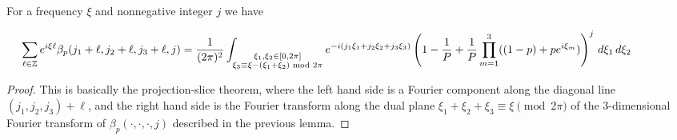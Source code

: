 \documentclass[11pt]{article}
\theoremstyle{plain}
\renewcommand{\mod}{\text{ mod }}
\begin{document}
\begin{lemma}\label{lem:beta-expression}
For a frequency $\xi$ and nonnegative integer $j$ we have

\[\hspace{-1.5cm}
\sum_{\ell \in\mathbb{Z}}e^{i\xi\ell}\beta_p(j_1+\ell,j_2+\ell,j_3+\ell,j)=\frac{1}{(2\pi)^2}\int_{\substack{\xi_1,\xi_2\in[0,2\pi]\\\xi_3\equiv \xi-(\xi_1+\xi_2) \mod 2\pi}}e^{-i(j_1 \xi_1+j_2\xi_2+j_3\xi_3)}\left(1-\frac{1}{P}+\frac{1}{P}\prod_{m=1}^3((1-p)+p e^{i \xi_m})\right)^j\,d\xi_1\,d\xi_2\]
\end{lemma}
\begin{proof}
This is basically the projection-slice theorem, where the left hand side is a Fourier component along the diagonal line $(j_1,j_2,j_3)+\ell$, and the right hand side is the Fourier transform along the dual plane $\xi_1+\xi_2+\xi_3\equiv\xi \pmod{2\pi}$ of the 3-dimensional Fourier transform of $\beta_p(\cdot,\cdot,\cdot,j)$ described in the previous lemma.
\end{proof}
\end{document}
